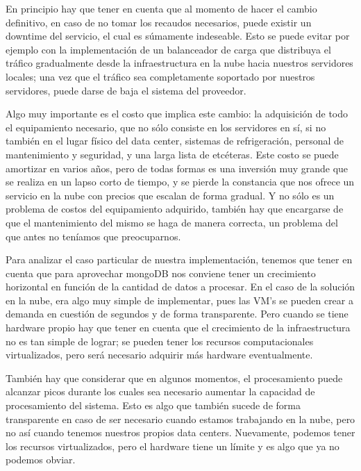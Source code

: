 \documentclass[a4paper,10pt,twoside]{article}
\begin{document}
En principio hay que tener en cuenta que al momento de hacer el cambio definitivo, en caso de no tomar los recaudos necesarios, puede existir un downtime del servicio, el cual es súmamente indeseable. Esto se puede evitar por ejemplo con la implementación de un balanceador de carga que distribuya el tráfico gradualmente desde la infraestructura en la nube hacia nuestros servidores locales; una vez que el tráfico sea completamente soportado por nuestros servidores, puede darse de baja el sistema del proveedor.

Algo muy importante es el costo que implica este cambio: la adquisición de todo el equipamiento necesario, que no sólo consiste en los servidores en sí, si no también en el lugar físico del data center, sistemas de refrigeración, personal de mantenimiento y seguridad, y una larga lista de etcéteras. Este costo se puede amortizar en varios años, pero de todas formas es una inversión muy grande que se realiza en un lapso corto de tiempo, y se pierde la constancia que nos ofrece un servicio en la nube con precios que escalan de forma gradual. Y no sólo es un problema de costos del equipamiento adquirido, también hay que encargarse de que el mantenimiento del mismo se haga de manera correcta, un problema del que antes no teníamos que preocuparnos.

Para analizar el caso particular de nuestra implementación, tenemos que tener en cuenta que para aprovechar mongoDB nos conviene tener un crecimiento horizontal en función de la cantidad de datos a procesar. En el caso de la solución en la nube, era algo muy simple de implementar, pues las VM's se pueden crear a demanda en cuestión de segundos y de forma transparente. Pero cuando se tiene hardware propio hay que tener en cuenta que el crecimiento de la infraestructura no es tan simple de lograr; se pueden tener los recursos computacionales virtualizados, pero será necesario adquirir más hardware eventualmente.

También hay que considerar que en algunos momentos, el procesamiento puede alcanzar picos durante los cuales sea necesario aumentar la capacidad de procesamiento del sistema. Esto es algo que también sucede de forma transparente en caso de ser necesario cuando estamos trabajando en la nube, pero no así cuando tenemos nuestros propios data centers. Nuevamente, podemos tener los recursos virtualizados, pero el hardware tiene un límite y es algo que ya no podemos obviar.
\end{document}
